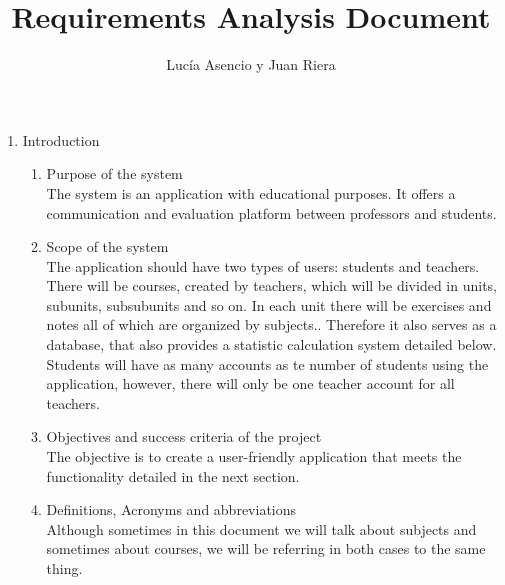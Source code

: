 \documentclass{article}
\title{Requirements Analysis Document}
\author{Lucía Asencio y Juan Riera}
\begin{document}
\maketitle
\begin{enumerate}
	\item{Introduction}
	\begin{enumerate}
		\item{Purpose of the system}
		\\The system is an application with educational purposes. It offers a communication and evaluation platform between professors and students.
		\item{Scope of the system}
		\\The application should have two types of users: students and teachers. There will be courses, created by teachers, which will be divided in units, subunits, subsubunits and so on. In each unit there will be exercises and notes all of which are organized by subjects.. Therefore it also serves as a database, that also provides a statistic calculation system detailed below.\\Students will have as many accounts as te number of students using the application, however, there will only be one teacher account for all teachers.
		\item{Objectives and success criteria of the project}
		\\The objective is to create a user-friendly application that meets the functionality detailed in the next section.
		\item{Definitions, Acronyms and abbreviations}
		\\Although sometimes in this document we will talk about subjects and sometimes about courses, we will be referring in both cases to the same thing.
	\end{enumerate}
	

\end{enumerate}
\end{document}
